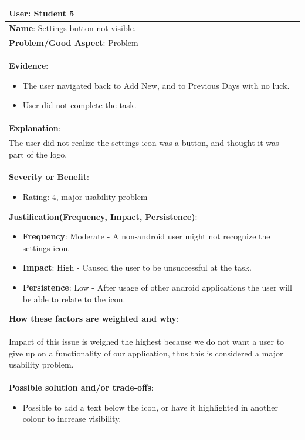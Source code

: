 \documentclass[pdftex,12pt,a4paper]{report}
\begin{document}
\begin{center}
	\begin{longtable}{|p{\textwidth}|}
	\hline
	\textbf{User}: Student 5\\
	\hline
	\textbf{Name}: Settings button not visible.\\
	\hline
	\textbf{Problem/Good Aspect}: Problem\\
	\hline
	\textbf{Evidence}:
	\begin{itemize}
	\item{The user navigated back to Add New, and to Previous Days with no luck.}
	\item{User did not complete the task.}
	\end{itemize}\\
	\hline
	\textbf{Explanation}:\\
	The user did not realize the settings icon was a button, and thought it was part of the logo.\\
	\hline
\textbf{Severity or Benefit}:
	\begin{itemize}
	\item{Rating: 4, major usability problem}
	\end{itemize}
	\textbf{Justification(Frequency, Impact, Persistence)}:
	\begin{itemize}
	\item{\textbf{Frequency}:} Moderate - A non-android user might not recognize the settings icon.
	\item{\textbf{Impact}:} High - Caused the user to be unsuccessful at the task.
	\item{\textbf{Persistence}:} Low - After usage of other android applications the user will be able to relate to the icon.
	\end{itemize}
	\textbf{How these factors are weighted and why}:\\
	Impact of this issue is weighed the highest because we do not want a user to give up on a functionality of our application, thus this is considered a major usability problem.\\
	\hline
	\textbf{Possible solution and/or trade-offs}:
	\begin{itemize}
	\item{Possible to add a text below the icon, or have it highlighted in another colour to increase visibility.}
	\end{itemize}\\
	\hline
	\end{longtable}
\end{center}
\end{document}

